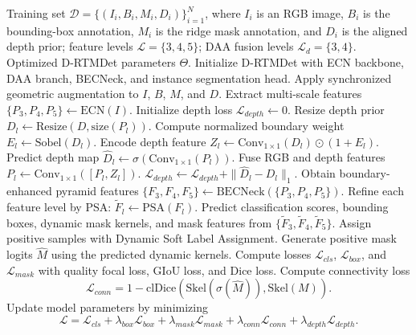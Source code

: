 
\begin{algorithm}[t]
\caption{Training procedure of D-RTMDet}
\label{alg:drtmdet_train}
\begin{algorithmic}[1]
\Require Training set $\mathcal{D}=\{(I_i,B_i,M_i,D_i)\}_{i=1}^{N}$, where $I_i$ is an RGB image, $B_i$ is the bounding-box annotation, $M_i$ is the ridge mask annotation, and $D_i$ is the aligned depth prior; feature levels $\mathcal{L}=\{3,4,5\}$; DAA fusion levels $\mathcal{L}_d=\{3,4\}$.
\Ensure Optimized D-RTMDet parameters $\Theta$.
\State Initialize D-RTMDet with ECN backbone, DAA branch, BECNeck, and instance segmentation head.
        \State Apply synchronized geometric augmentation to $I$, $B$, $M$, and $D$.
        \State Extract multi-scale features $\{P_3,P_4,P_5\}\gets \mathrm{ECN}(I)$.
        \State Initialize depth loss $\mathcal{L}_{depth}\gets 0$.
            \State Resize depth prior $D_l\gets \mathrm{Resize}(D,\mathrm{size}(P_l))$.
            \State Compute normalized boundary weight $E_l\gets \mathrm{Sobel}(D_l)$.
            \State Encode depth feature $Z_l\gets \mathrm{Conv}_{1\times1}(D_l)\odot(1+E_l)$.
            \State Predict depth map $\hat{D}_l\gets \sigma(\mathrm{Conv}_{1\times1}(P_l))$.
            \State Fuse RGB and depth features $P_l\gets \mathrm{Conv}_{1\times1}([P_l,Z_l])$.
            \State $\mathcal{L}_{depth}\gets \mathcal{L}_{depth}+\|\hat{D}_l-D_l\|_1$.
        \EndFor
        \State Obtain boundary-enhanced pyramid features $\{F_3,F_4,F_5\}\gets \mathrm{BECNeck}(\{P_3,P_4,P_5\})$.
        \State Refine each feature level by PSA: $\tilde{F}_l\gets \mathrm{PSA}(F_l)$.
        \State Predict classification scores, bounding boxes, dynamic mask kernels, and mask features from $\{\tilde{F}_3,\tilde{F}_4,\tilde{F}_5\}$.
        \State Assign positive samples with Dynamic Soft Label Assignment.
        \State Generate positive mask logits $\hat{M}$ using the predicted dynamic kernels.
        \State Compute losses $\mathcal{L}_{cls}$, $\mathcal{L}_{box}$, and $\mathcal{L}_{mask}$ with quality focal loss, GIoU loss, and Dice loss.
        \State Compute connectivity loss
        \[
        \mathcal{L}_{conn}=1-\mathrm{clDice}(\mathrm{Skel}(\sigma(\hat{M})),\mathrm{Skel}(M)).
        \]
        \State Update model parameters by minimizing
        \[
        \mathcal{L}=\mathcal{L}_{cls}+\lambda_{box}\mathcal{L}_{box}
        +\lambda_{mask}\mathcal{L}_{mask}
        +\lambda_{conn}\mathcal{L}_{conn}
        +\lambda_{depth}\mathcal{L}_{depth}.
        \]
    \EndFor
\EndFor
\end{algorithmic}
\end{algorithm}

